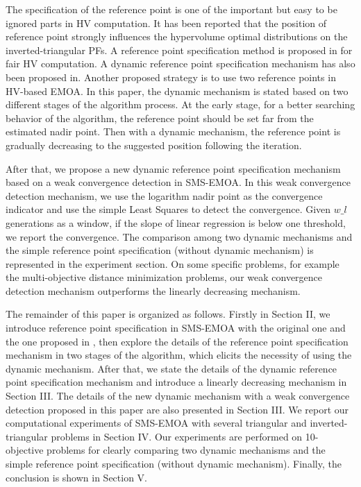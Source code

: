 \documentclass[conference]{IEEEtran}
\begin{document}
The specification of the reference point is one of the important but easy to be ignored parts in HV computation.  
It has been reported that the position of reference point strongly influences the hypervolume optimal distributions 
on the inverted-triangular PFs\cite{hisao:RPhowtoSpecify, hisao:RPspecify, hisao:RPexplanation}. 
A reference point specification method is proposed in \cite{hisao:RPspecify} for fair HV computation.
A dynamic reference point specification mechanism has also been proposed in\cite{hisao:dynamic}.
Another proposed strategy is to use two reference points in HV-based EMOA\cite{hisao:twoRP}. 
In this paper, the dynamic mechanism is stated based on two different stages of the algorithm process. 
At the early stage, for a better searching behavior of the algorithm, 
the reference point should be set far from the estimated nadir point. 
Then with a dynamic mechanism, the reference point is gradually decreasing to the suggested position following the iteration. 

After that, we propose a new dynamic reference point specification mechanism based on a weak convergence detection in SMS-EMOA. 
In this weak convergence detection mechanism, we use the logarithm nadir point as the convergence indicator
and use the simple Least Squares\cite{SimpleLeastSquares} to detect the convergence. 
Given $w\_l$ generations as a window, if the slope of linear regression is below one threshold, we report the convergence.
The comparison among two dynamic mechanisms and the simple reference point specification (without dynamic mechanism) is 
represented in the experiment section. On some specific problems, for example the multi-objective distance minimization problems\cite{dmp},
our weak convergence detection mechanism outperforms the linearly decreasing mechanism. 

The remainder of this paper is organized as follows. 
Firstly in Section II, we introduce reference point specification in SMS-EMOA with
the original one and the one proposed in \cite{hisao:RPhowtoSpecify},
then explore the details of the reference point specification mechanism in two stages of the algorithm, 
which elicits the necessity of using the dynamic mechanism.
After that, we state the details of the dynamic reference point specification mechanism and introduce 
a linearly decreasing mechanism in Section III. 
The details of the new dynamic mechanism with a weak convergence detection proposed in this paper are also presented in Section III. 
We report our computational experiments of SMS-EMOA 
with several triangular and inverted-triangular problems in Section IV. Our experiments are performed on
10-objective problems for clearly comparing two dynamic mechanisms and the simple reference point specification (without dynamic mechanism). 
Finally, the conclusion is shown in Section V.
\end{document}
